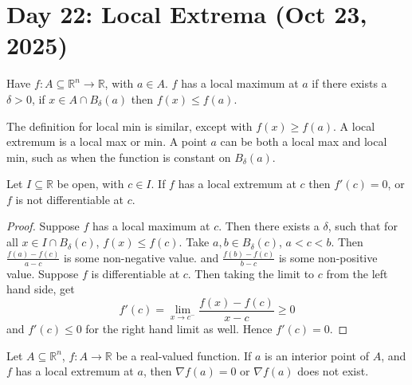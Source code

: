\section{Day 22: Local Extrema (Oct 23, 2025)}

\begin{definition}
    Have $f : A \subseteq \mathbb{R}^n \to \mathbb{R}$, with $a \in A$. $f$ has a local maximum at $a$ if there exists a $\delta > 0$, if $x \in A \cap B_ \delta(a)$ then $f(x) \leq f(a)$.
\end{definition}

\noindent The definition for local min is similar, except with $f(x) \geq f(a)$. A local extremum is a local max or min. A point $a$ can be both a local max and local min, such as when the function is constant on $B_ \delta(a)$.

\begin{simplethm}
    Let $I \subseteq \mathbb{R}$ be open, with $c \in I$. If $f$ has a local extremum at $c$ then $f'(c) = 0$, or $f$ is not differentiable at $c$. 
\end{simplethm}

\begin{proof}
    Suppose $f$ has a local maximum at $c$. Then there exists a $\delta$, such that for all $x \in I \cap B_ \delta(c)$, $f(x) \leq f(c)$. Take $a, b \in B_ \delta(c)$, $a < c < b$. Then $\frac{f(a) - f(c)}{a - c}$ is some non-negative value. and $\frac{f(b) - f(c)}{b - c}$ is some non-positive value. Suppose $f$ is differentiable at $c$. Then taking the limit to $c$ from the left hand side, get
    \[
    f'(c) = \lim_{ x \to c^- } \frac{f(x) - f(c)}{x - c} \geq 0
    \]
    and $f'(c) \leq 0$ for the right hand limit as well. Hence $f'(c) = 0$. 
\end{proof}

\begin{simplethm}
    Let $A \subseteq \mathbb{R}^n$, $f : A \to \mathbb{R}$ be a real-valued function. If $a$ is an interior point of $A$, and $f$ has a local extremum at $a$, then $\nabla f(a) = 0$ or $\nabla f(a)$ does not exist.
\end{simplethm}
